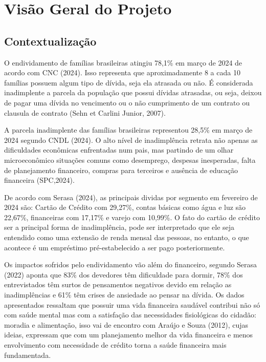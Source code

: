 \chapter{Visão Geral do Projeto}



\section{Contextualização}

O endividamento de famílias brasileiras atingiu 78,1\% em março de 2024 de acordo com CNC (2024). Isso representa que aproximadamente 8 a cada 10 famílias possuem algum tipo de dívida, seja ela atrasada ou não. É considerada inadimplente a parcela da população que possui dívidas atrasadas, ou seja, deixou de pagar uma dívida no vencimento ou o não cumprimento de um contrato ou clausula de contrato (Sehn et Carlini Junior, 2007).

A parcela inadimplente das famílias brasileiras representou 28,5\% em março de 2024 segundo CNDL (2024). O alto nível de inadimplência retrata não apenas as dificuldades econômicas enfrentadas num pais, mas partindo de um olhar microeconômico  situações comuns como desemprego, despesas inesperadas, falta de planejamento financeiro, compras para terceiros e ausência de educação financeira (SPC,2024).

De acordo com  Serasa (2024), as principais dividas por segmento em fevereiro de 2024 são: Cartão de Crédito com 29,27\%, contas básicas como água e luz são 22,67\%, financeiras com 17,17\% e varejo com 10,99\%. O fato do cartão de crédito ser a principal forma de inadimplência, pode ser interpretado que ele seja entendido como uma extensão de renda mensal das pessoas, no entanto, o que acontece é um empréstimo pré-estabelecido a ser pago posteriormente.

Os impactos sofridos pelo endividamento vão além do financeiro, segundo Serasa (2022) aponta que 83\% dos devedores têm dificuldade para dormir, 78\% dos entrevistados têm surtos de pensamentos negativos devido em relação as inadimplências e 61\% têm crises de ansiedade ao pensar na dívida. Os dados apresentados ressaltam que possuir uma vida financeira saudável contribui não só com saúde mental mas com a satisfação das necessidades fisiológicas do cidadão: moradia e alimentação, isso vai de encontro com Araújo e Souza (2012), cujas ideias, expressam que com um planejamento melhor da vida financeira e menos envolvimento com necessidade de crédito torna a saúde financeira mais fundamentada.  

